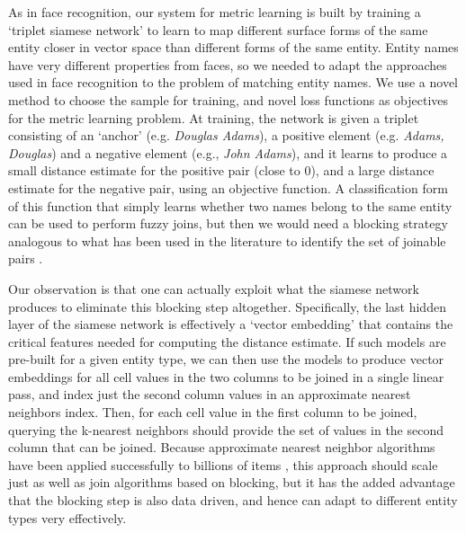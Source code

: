 As in face recognition, our system for metric learning is built by training a `triplet siamese network' to learn to map different surface forms of the same entity closer in vector space than different forms of the same entity.  Entity names have very different properties from faces, so we needed to adapt the approaches used in face recognition to the problem of matching entity names.  We use a novel method to choose the sample for training, and novel loss functions as objectives for the metric learning problem.  At training, the network is given a triplet consisting of an `anchor' (e.g. \textit{Douglas Adams}), a positive element (e.g. \textit{Adams, Douglas}) and a negative element (e.g., \textit{John Adams}), and it learns to produce a small distance estimate for the positive pair (close to 0), and a large distance estimate for the negative pair, using an objective function. A classification form of this function that simply learns whether two names belong to the same entity can be used to perform fuzzy joins, but then we would need a blocking strategy analogous to what has been used in the literature to identify the set of joinable pairs \cite{auto-join-joining-tables-leveraging-transformations}.  

Our observation is that one can actually exploit what the siamese network produces to eliminate this blocking step altogether.  Specifically, the last hidden layer of the siamese network is effectively a `vector embedding' that contains the critical features needed for computing the distance estimate.  If such models are pre-built for a given entity type, we can then use the models to produce vector embeddings for all cell values in the two columns to be joined in a single linear pass, and index just the second column values in an approximate nearest neighbors index.  Then, for each cell value in the first column to be joined, querying the k-nearest neighbors should provide the set of values in the second column that can be joined.  Because approximate nearest neighbor algorithms have been applied successfully to billions of items \cite{JDH17}, this approach should scale just as well as join algorithms based on blocking, but it has the added advantage that the blocking step is also data driven, and hence can adapt to different entity types very effectively.

